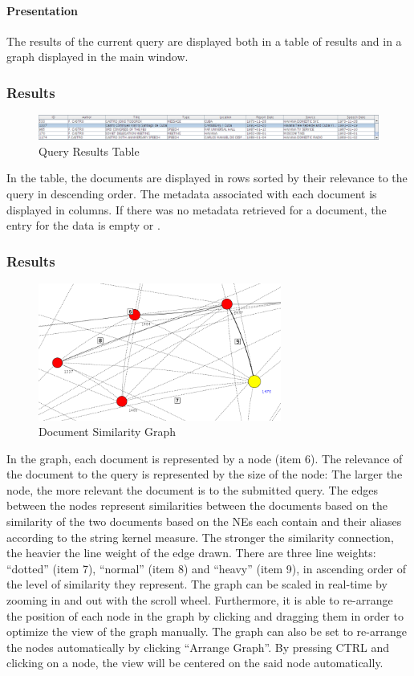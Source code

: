 \paragraph{Presentation}
The results of the current query are displayed both in a table of results and in a graph displayed in the main window.

\subsubsection{Results}
\begin{figure}[h]
\centering
\caption{Query Results Table}
\includegraphics[width=160mm]{table.png}
\end{figure}

In the table, the documents are displayed in rows sorted by their relevance to the query in descending order. The metadata associated with each document is displayed in columns. If there was no metadata retrieved for a document, the entry for the data is empty or .

\subsubsection{Results}
\begin{figure}[h]
\centering
\caption{Document Similarity Graph}
\includegraphics[width=80mm]{nodecloseup.png}
\end{figure}

In the graph, each document is represented by a node (item 6). The relevance of the document to the query is represented by the size of the node: The larger the node, the more relevant the document is to the submitted query. The edges between the nodes represent similarities between the documents based on the similarity of the two documents based on the NEs each contain and their aliases according to the string kernel measure. The stronger the similarity connection, the heavier the line weight of the edge drawn. There are three line weights: ``dotted'' (item 7), ``normal'' (item 8) and ``heavy'' (item 9), in ascending order of the level of similarity they represent. The graph can be scaled in real-time by zooming in and out with the scroll wheel. Furthermore, it is able to re-arrange the position of each node in the graph by clicking and dragging them in order to optimize the view of the graph manually. The graph can also be set to re-arrange the nodes automatically by clicking ``Arrange Graph''. By pressing CTRL and clicking on a node, the view will be centered on the said node automatically.

